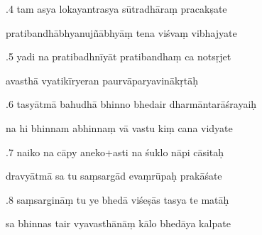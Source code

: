 \documentclass[article,12pt,a4paper]{memoir}%
\newcounter{parCount}
\begin{document}
	  
	  \pstart {}.4 tam asya lokayantrasya sūtradhāraṃ pracakṣate 
	{}
	\pend%
      

	  
	  \pstart \leavevmode%
	pratibandhābhyanujñābhyāṃ tena viśvaṃ vibhajyate 
	{}
	\pend%
      

	  
	  \pstart {}.5 yadi na pratibadhnīyāt pratibandhaṃ ca notsṛjet 
	{}
	\pend%
      

	  
	  \pstart \leavevmode%
	avasthā vyatikīryeran paurvāparyavinākṛtāḥ 
	{}
	\pend%
      

	  
	  \pstart {}.6 tasyātmā bahudhā bhinno bhedair dharmāntarāśrayaiḥ 
	{}
	\pend%
      

	  
	  \pstart \leavevmode%
	na hi bhinnam abhinnaṃ vā vastu kiṃ cana vidyate 
	{}
	\pend%
      

	  
	  \pstart {}.7 naiko na cāpy aneko+asti na śuklo nāpi cāsitaḥ 
	{}
	\pend%
      

	  
	  \pstart \leavevmode%
	dravyātmā sa tu saṃsargād evaṃrūpaḥ prakāśate 
	{}
	\pend%
      

	  
	  \pstart {}.8 saṃsargināṃ tu ye bhedā viśeṣās tasya te matāḥ 
	{}
	\pend%
      

	  
	  \pstart \leavevmode%
	sa bhinnas tair vyavasthānāṃ kālo bhedāya kalpate 
	{}
	\pend%
      
\end{document}

